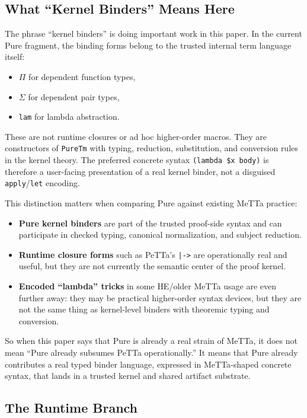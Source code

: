 \documentclass[11pt]{article}
\theoremstyle{remark}
\newcommand{\MeTTa}{\textup{MeTTa}}
\newcommand{\PeTTa}{\textup{PeTTa}}
\newcommand{\HE}{\textup{HE}}
\newcommand{\code}[1]{\texttt{#1}}
\newcommand{\leanref}[1]{\texttt{#1}}
\begin{document}
\subsection{What ``Kernel Binders'' Means Here}
\label{sec:kernel-binders}

The phrase ``kernel binders'' is doing important work in this paper. In the
current Pure fragment, the binding forms belong to the trusted internal term
language itself:
\begin{itemize}[nosep]
  \item $\Pi$ for dependent function types,
  \item $\Sigma$ for dependent pair types,
  \item \leanref{lam} for lambda abstraction.
\end{itemize}

\noindent
These are not runtime closures or ad hoc higher-order macros. They are
constructors of \leanref{PureTm} with typing, reduction, substitution, and
conversion rules in the kernel theory. The preferred concrete syntax
\code{(lambda \$x body)} is therefore a user-facing presentation of a real
kernel binder, not a disguised \code{apply}/\code{let} encoding.

\noindent
This distinction matters when comparing Pure against existing \MeTTa{}
practice:
\begin{itemize}[nosep]
  \item \textbf{Pure kernel binders} are part of the trusted proof-side syntax
  and can participate in checked typing, canonical normalization, and subject
  reduction.
  \item \textbf{Runtime closure forms} such as \PeTTa{}'s \code{|->} are
  operationally real and useful, but they are not currently the semantic center
  of the proof kernel.
  \item \textbf{Encoded ``lambda'' tricks} in some \HE{}/older \MeTTa{} usage
  are even further away: they may be practical higher-order syntax devices,
  but they are not the same thing as kernel-level binders with theoremic
  typing and conversion.
\end{itemize}

\noindent
So when this paper says that Pure is already a real strain of \MeTTa{}, it does
not mean ``Pure already subsumes \PeTTa{} operationally.'' It means that Pure
already contributes a real typed binder language, expressed in \MeTTa{}-shaped
concrete syntax, that lands in a trusted kernel and shared artifact substrate.

\subsection{The Runtime Branch}
\label{sec:runtime-branch}
\end{document}
